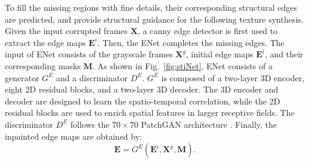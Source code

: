 To fill the missing regions with fine details, their corresponding structural edges are predicted, and provide structural guidance for the following texture synthesis.
%
Given the input corrupted frames $\boldsymbol{X}$, a canny edge detector is first used to extract the edge maps $\boldsymbol{E}^{i}$. %
Then, the ENet completes the missing edges.
The input of ENet consists of the grayscale frames $\boldsymbol{X}^{g}$, initial edge maps $\boldsymbol{E}^{i}$, and their corresponding masks $\boldsymbol{M}$.
%
As shown in Fig.~\ref{fig:stiNet}, ENet consists of a generator $G^E$ and a discriminator $D^E$.
$G^E$ is composed of a two-layer 3D encoder, eight 2D residual blocks, and a two-layer 3D decoder. 
The 3D encoder and decoder are designed to learn the spatio-temporal correlation, while the 2D residual blocks are used to enrich spatial features in larger receptive fields. The discriminator $D^E$ follows the $70\times 70$ PatchGAN architecture \cite{Isola_2017_CVPR}. 
Finally, the inpainted edge maps are obtained by:
\begin{equation}
\label{eq:edgenet}
\boldsymbol{E}=G^E(\boldsymbol{E}^{i},\boldsymbol{X}^{g},\boldsymbol{M}).
\end{equation}

